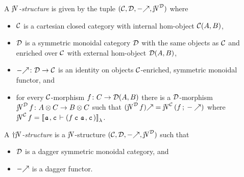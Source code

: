 \documentclass[runningheads,envcountsame]{llncs}
\begin{document}
    \begin{definition}
        A \emph{$\juncurry$-structure} is given by the tuple $(\C, \D, \f{-}, \juncurry[\D])$ where
        \begin{itemize}
            \item $\mathcal{C}$ is a cartesian closed category with internal hom-object $\mathcal{C}(A, B)$,
            \item $\mathcal{D}$ is a symmetric monoidal category $\mathcal{D}$ with the same objects as $\mathcal{C}$ and enriched over $\mathcal{C}$ with external hom-object $\mathcal{D}(A, B)$,
            \item $\f{-}\colon \D \to \C$ is an identity on objects $\mathcal{C}$-enriched, symmetric monoidal functor, and 
            \item for every $\mathcal{C}$-morphism $f\colon C \to \mathcal{D}(A, B)$ there is a $\mathcal{D}$-morphism $\juncurry[\D]\,f\colon \tensor{A}{C} \to \tensor{B}{C}$ such that $\f{(\juncurry[\D]\,f)} = \juncurry[\C]\,(\comp{f}{\f{-}})$ where $\juncurry[\C]\,f = \semL{\evar{a}, \evar{c}\vdash \epair{\eapp{\eapp{f}{\evar{c}}}{\evar{a}}}{\evar{c}}}$.
        \end{itemize}
        
        A \emph{$\dagger\juncurry$-structure} is a $\juncurry$-structure $(\C, \D, \f{-}, \juncurry[\D])$ such that
        \begin{itemize}
            \item $\mathcal{D}$ is a dagger symmetric monoidal category, and
            \item $\f{-}$ is a dagger functor.
        \end{itemize}
    \end{definition}
    
\end{document}
